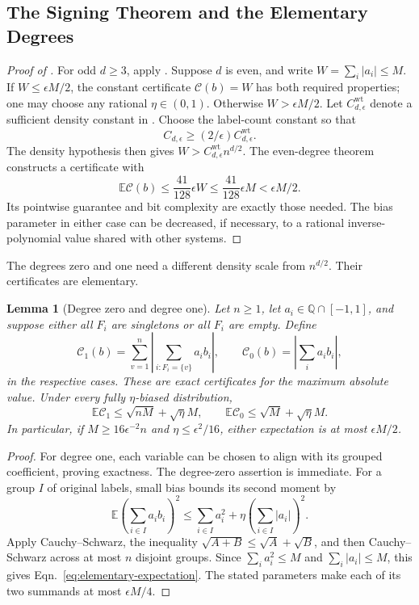 \documentclass[letterpaper,11pt]{article}
\newtheorem{lemma}[theorem]{Lemma}
\theoremstyle{definition}
\newcommand{\Q}{\mathbb Q}
\newcommand{\E}{\mathbb E}
\newcommand{\abs}[1]{\left|#1\right|}
\begin{document}
\subsection{The Signing Theorem and the Elementary Degrees}

\begin{proof}[Proof of ]
For odd $d\ge3$, apply .
Suppose $d$ is even, and write $W=\sum_i|a_i|\le M$.
If $W\le\epsilon M/2$, the constant certificate
$\mathcal C(b)=W$ has both required properties; one may choose any
rational $\eta\in(0,1)$. Otherwise $W>\epsilon M/2$.
Let $C^{\mathrm{wt}}_{d,\epsilon}$ denote a sufficient density
constant in . Choose the label-count constant
so that
\[
 C_{d,\epsilon}\ge(2/\epsilon)C^{\mathrm{wt}}_{d,\epsilon}.
\]
The density hypothesis then gives
$W>C^{\mathrm{wt}}_{d,\epsilon}n^{d/2}$. The even-degree theorem
constructs a certificate with
\[
 \E\mathcal C(b)\le\frac{41}{128}\epsilon W
 \le\frac{41}{128}\epsilon M<\epsilon M/2.
\]
Its pointwise guarantee and bit complexity are exactly those needed.
The bias parameter in either case can be decreased, if necessary, to
a rational inverse-polynomial value shared with other systems.
\end{proof}

The degrees zero and one need a different density scale from
$n^{d/2}$. Their certificates are elementary.

\begin{lemma}[Degree zero and degree one]
\label{lem:elementary-degrees}
Let $n\ge1$, let $a_i\in\Q\cap[-1,1]$, and suppose either
all $F_i$ are singletons or all $F_i$ are empty. Define
\begin{equation}
 \mathcal C_1(b)=\sum_{v=1}^n
       \abs{\sum_{i:F_i=\{v\}}a_ib_i},
 \qquad
 \mathcal C_0(b)=\abs{\sum_i a_ib_i},
 \label{eq:elementary-certificates}
\end{equation}
in the respective cases. These are exact certificates for the
maximum absolute value. Under every fully $\eta$-biased
distribution,
\begin{equation}
 \E\mathcal C_1\le\sqrt{nM}+\sqrt\eta M,
 \qquad
 \E\mathcal C_0\le\sqrt M+\sqrt\eta M.
 \label{eq:elementary-expectation}
\end{equation}
In particular, if $M\ge16\epsilon^{-2}n$ and
$\eta\le\epsilon^2/16$, either expectation is at most
$\epsilon M/2$.
\end{lemma}
\begin{proof}
For degree one, each variable can be chosen to align with its grouped
coefficient, proving exactness. The degree-zero assertion is immediate.
For a group $I$ of original labels, small bias bounds its second
moment by
\[
 \E\left(\sum_{i\in I}a_ib_i\right)^2
 \le\sum_{i\in I}a_i^2+
       \eta\left(\sum_{i\in I}|a_i|\right)^2.
\]
Apply Cauchy--Schwarz, the inequality $\sqrt{A+B}\le\sqrt A+\sqrt B$,
and then Cauchy--Schwarz across at most $n$ disjoint groups.
Since $\sum_i a_i^2\le M$ and $\sum_i|a_i|\le M$, this gives
Eqn.~\eqref{eq:elementary-expectation}. The stated parameters make
each of its two summands at most $\epsilon M/4$.
\end{proof}
\end{document}
